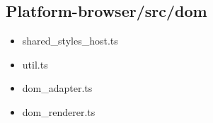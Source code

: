 \subsection{Platform-browser/src/dom}



\begin{itemize}
  \item shared\_styles\_host.ts
  \item util.ts
  \item dom\_adapter.ts
  \item dom\_renderer.ts
\end{itemize}










